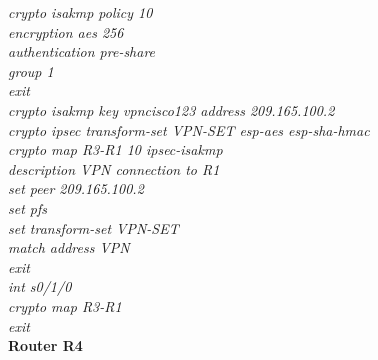 \documentclass[a4paper, 12pt]{article}
\begin{document}
\hspace*{2cm}\textit{crypto isakmp policy 10\\
\hspace*{2cm}encryption aes 256\\
\hspace*{2cm}authentication pre-share\\
\hspace*{2cm}group 1\\
\hspace*{2cm}exit\\
\hspace*{2cm}crypto isakmp key vpncisco123 address 209.165.100.2\\
\hspace*{2cm}crypto ipsec transform-set VPN-SET esp-aes esp-sha-hmac\\
\hspace*{2cm}crypto map R3-R1 10 ipsec-isakmp\\
\hspace*{2cm}description VPN connection to R1\\
\hspace*{2cm}set peer 209.165.100.2\\
\hspace*{2cm}set pfs\\
\hspace*{2cm}set transform-set VPN-SET\\
\hspace*{2cm}match address VPN\\
\hspace*{2cm}exit \\
\hspace*{2cm}int s0/1/0\\
\hspace*{2cm}crypto map R3-R1\\
\hspace*{2cm}exit\\}
\hspace*{1cm}\textbf{Router R4}	\\
\end{document}
